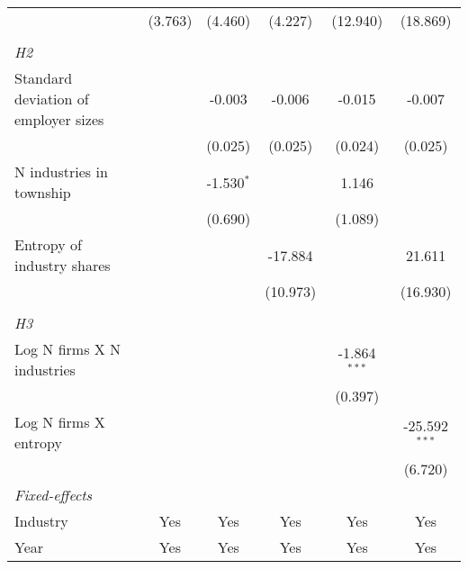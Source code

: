 \begin{tabular}{lccccc}
                                             & (3.763)          & (4.460)          & (4.227)          & (12.940)         & (18.869)\\   
\hdashline %
\\[0.1ex] %
\emph{H2} \\ 
   Standard deviation of employer sizes      &                  & -0.003           & -0.006           & -0.015           & -0.007\\   
                                             &                  & (0.025)          & (0.025)          & (0.024)          & (0.025)\\   
   N industries in township                  &                  & -1.530$^{*}$     &                  & 1.146            &   \\   
                                             &                  & (0.690)          &                  & (1.089)          &   \\   
   Entropy of industry shares                &                  &                  & -17.884          &                  & 21.611\\   
                                             &                  &                  & (10.973)         &                  & (16.930)\\   
\hdashline %
\\[0.1ex] %
\emph{H3} \\ 
   Log N firms X N industries                &                  &                  &                  & -1.864$^{***}$   &   \\   
                                             &                  &                  &                  & (0.397)          &   \\   
   Log N firms X entropy                     &                  &                  &                  &                  & -25.592$^{***}$\\   
                                             &                  &                  &                  &                  & (6.720)\\   
   \midrule
   \emph{Fixed-effects}\\
   Industry                                  & Yes              & Yes              & Yes              & Yes              & Yes\\  
   Year                                      & Yes              & Yes              & Yes              & Yes              & Yes\\  

\end{tabular}
